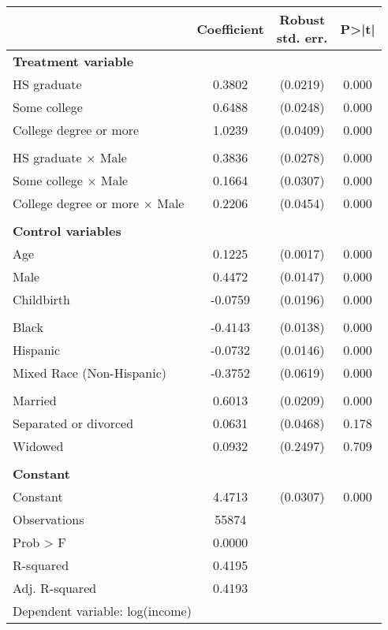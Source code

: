 {
\def\sym#1{\ifmmode^{#1}\else\(^{#1}\)\fi}
\begin{tabular}{l*{1}{ccc}}
\toprule
                    & Coefficient&\shortstack{Robust\\std. err.}&       P>|t|\\
\midrule
\textbf{Treatment variable}&            &            &            \\
HS graduate         &      0.3802&    (0.0219)&       0.000\\
Some college        &      0.6488&    (0.0248)&       0.000\\
College degree or more&      1.0239&    (0.0409)&       0.000\\
                    &            &            &            \\
HS graduate $\times$ Male&      0.3836&    (0.0278)&       0.000\\
Some college $\times$ Male&      0.1664&    (0.0307)&       0.000\\
College degree or more $\times$ Male&      0.2206&    (0.0454)&       0.000\\
\\ \textbf{Control variables}&            &            &            \\
Age                 &      0.1225&    (0.0017)&       0.000\\
Male                &      0.4472&    (0.0147)&       0.000\\
Childbirth          &     -0.0759&    (0.0196)&       0.000\\
                    &            &            &            \\
Black               &     -0.4143&    (0.0138)&       0.000\\
Hispanic            &     -0.0732&    (0.0146)&       0.000\\
Mixed Race (Non-Hispanic)&     -0.3752&    (0.0619)&       0.000\\
                    &            &            &            \\
Married             &      0.6013&    (0.0209)&       0.000\\
Separated or divorced&      0.0631&    (0.0468)&       0.178\\
Widowed             &      0.0932&    (0.2497)&       0.709\\
\\ \textbf{Constant}&            &            &            \\
Constant            &      4.4713&    (0.0307)&       0.000\\
\midrule
Observations        &       55874&            &            \\
Prob > F            &      0.0000&            &            \\
R-squared           &      0.4195&            &            \\
Adj. R-squared      &      0.4193&            &            \\
\bottomrule
\multicolumn{4}{l}{\footnotesize Dependent variable: log(income)}\\
\end{tabular}
}
